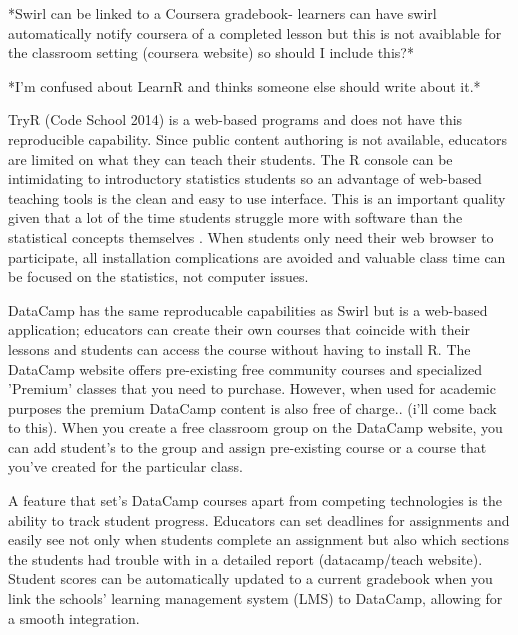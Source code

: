\documentclass{tise_style}
\begin{document}
*Swirl can be linked to a Coursera gradebook- learners can have swirl automatically notify coursera of a completed lesson
but this is not avaiblable for the classroom setting (coursera website) so should I include this?* 

*I'm confused about LearnR and thinks someone else should write about it.*

TryR (Code School 2014) is a web-based programs and does not have this reproducible capability. Since public content authoring 
is not available, educators are limited on what they can teach their students. The R console can be intimidating to 
introductory statistics students so an advantage of web-based teaching tools is 
the clean and easy to use interface. This is an important quality given that a lot of the time students struggle more with 
software than the statistical concepts themselves \citep{Hare2017}. When students only need their web browser to participate,
all installation complications are avoided and valuable class time can be focused on the statistics, not computer issues.


DataCamp has the same reproducable capabilities as Swirl but is a web-based application; educators can 
create their own courses that coincide with their lessons and students can access the course without having to install R. 
The DataCamp website offers pre-existing free community courses and specialized 'Premium' classes that you need to purchase. 
However, when used for academic purposes the premium DataCamp content is also free of charge.. (i'll come back to this). 
When you create a free classroom group on the DataCamp website, you can add student's to the group and assign pre-existing 
course or a course that you've created for the particular class. 
 
A feature that set's DataCamp courses apart from competing technologies is the ability to track student progress. Educators
can set deadlines for assignments and easily see not only when students complete an assignment but also which sections the
students had trouble with in a detailed report (datacamp/teach website). Student scores can be automatically updated to a 
current gradebook when you link the schools' learning management system (LMS) to DataCamp, allowing for a smooth integration. 
 
\end{document}
